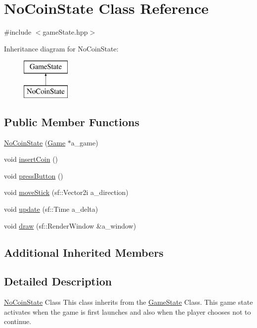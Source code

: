 \hypertarget{class_no_coin_state}{}\section{No\+Coin\+State Class Reference}
\label{class_no_coin_state}


{\ttfamily \#include $<$game\+State.\+hpp$>$}

Inheritance diagram for No\+Coin\+State\+:\begin{figure}[H]
\begin{center}
\leavevmode
\includegraphics[height=2.000000cm]{class_no_coin_state}
\end{center}
\end{figure}
\subsection*{Public Member Functions}
\begin{DoxyCompactItemize}
\item 
\hyperlink{class_no_coin_state_a3c0129051f00eb142a2055e181264549}{No\+Coin\+State} (\hyperlink{class_game}{Game} $\ast$a\+\_\+game)
\item 
void \hyperlink{class_no_coin_state_a417209eadad2f71284cf09d369bc389e}{insert\+Coin} ()
\item 
void \hyperlink{class_no_coin_state_a47dd2924ce9601b45ee11e0d9b8452f7}{press\+Button} ()
\item 
void \hyperlink{class_no_coin_state_a9fe8f36082705e6f5833244890093adc}{move\+Stick} (sf\+::\+Vector2i a\+\_\+direction)
\item 
void \hyperlink{class_no_coin_state_af0194851310c6df176770713341a8b80}{update} (sf\+::\+Time a\+\_\+delta)
\item 
void \hyperlink{class_no_coin_state_ab1e920e22b90f9d36954e75ea49c3f9b}{draw} (sf\+::\+Render\+Window \&a\+\_\+window)
\end{DoxyCompactItemize}
\subsection*{Additional Inherited Members}


\subsection{Detailed Description}
\hyperlink{class_no_coin_state}{No\+Coin\+State} Class This class inherits from the \hyperlink{class_game_state}{Game\+State} Class. This game state activates when the game is first launches and also when the player chooses not to continue. 

